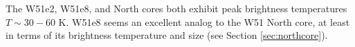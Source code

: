 




The W51e2, W51e8, and North cores both exhibit peak brightness temperatures
$T\sim30-60$ K.  W51e8 seems an excellent analog to the W51 North core, at
least in terms of its brightness temperature and size (see Section
\ref{sec:northcore}).  



